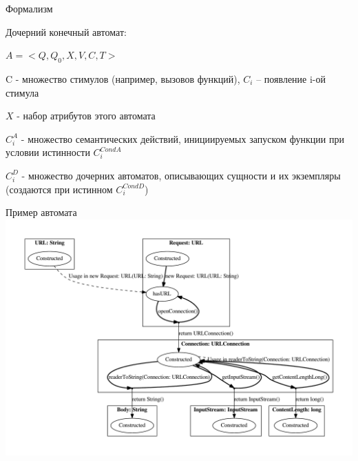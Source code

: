 \documentclass[12pt]{beamer}
\begin{document}
{
\begin{frame}{Формализм}
  \begin{mybox}[]
  Дочерний конечный автомат:
  
	$A = <Q, Q_0, X, V, C, T>$
	
	C - множество стимулов (например, вызовов функций), $C_i$ – появление i-ой стимула
	
	$X$ - набор атрибутов этого автомата
	
	$C_i^A$ - множество семантических действий, инициируемых запуском функции при условии истинности $C_i^{CondA}$
	
	$C_i^D$ - множество дочерних автоматов, описывающих сущности и их экземпляры (создаются при истинном $C_i^{CondD}$)
  \end{mybox}
\end{frame}
}


\begin{frame}{Пример автомата}
	\includegraphics[width=\textwidth]{java.pdf}
\end{frame}
\end{document}
